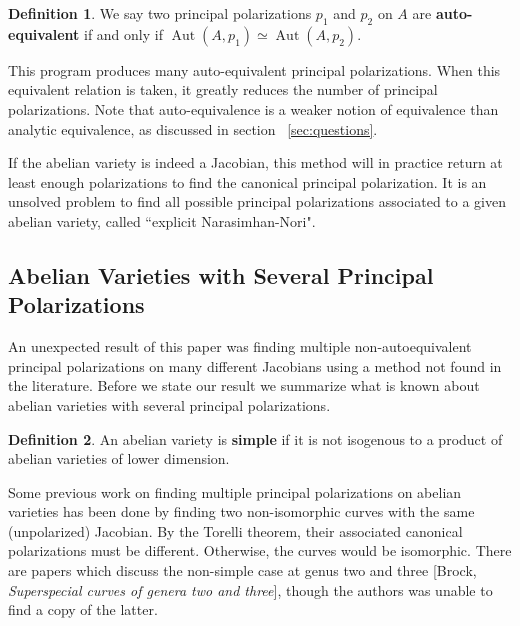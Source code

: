 \documentclass[12pt,reqno]{amsart}
\DeclareMathOperator{\Aut}{Aut}
\theoremstyle{definition}
\newtheorem{defn}{Definition}
\theoremstyle{remark}
\begin{document}


\begin{defn} We say two principal polarizations $p_1$ and $p_2$ on $A$ are \textbf{auto-equivalent} if and only if $\Aut(A, p_1) \simeq \Aut(A, p_2)$. \end{defn}

This program produces many auto-equivalent principal polarizations. When this equivalent relation is taken, it greatly reduces the number of principal polarizations. Note that auto-equivalence is a weaker notion of equivalence than analytic equivalence, as discussed in section ~\ref{sec:questions}. 

If the abelian variety is indeed a Jacobian, this method will in practice return at least enough polarizations to find the canonical principal polarization. It is an unsolved problem to find all possible principal polarizations associated to a given abelian variety, called ``explicit Narasimhan-Nori". 

\subsection{Abelian Varieties with Several Principal Polarizations}
\label{sec:accident}
An unexpected result of this paper was finding multiple non-autoequivalent principal polarizations on many different Jacobians using a method not found in the literature. Before we state our result we summarize what is known about abelian varieties with several principal polarizations.

\begin{defn} An abelian variety is \textbf{simple} if it is not isogenous to a product of abelian varieties of lower dimension. \end{defn}

Some previous work on finding multiple principal polarizations on abelian varieties has been done by finding two non-isomorphic curves with the same (unpolarized) Jacobian. By the Torelli theorem, their associated canonical polarizations must be different. Otherwise, the curves would be isomorphic. There are papers which discuss the non-simple case at genus two \cite{iko} and three [Brock, \textit{Superspecial curves of genera two and three}], though the authors was unable to find a copy of the latter. 
\end{document}
